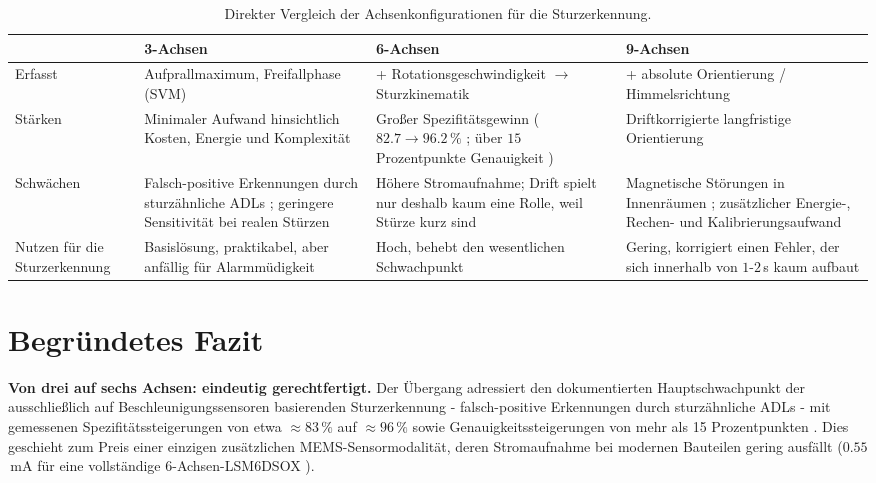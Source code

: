 \documentclass[11pt,a4paper,oneside]{report}
\begin{document}
\begin{table}[H]
\centering
\caption{Direkter Vergleich der Achsenkonfigurationen für die Sturzerkennung.}
\label{tab:glance}
\small
\begin{tabularx}{\textwidth}{l X X X}
\toprule
 & \textbf{3-Achsen} & \textbf{6-Achsen} & \textbf{9-Achsen} \\
\midrule
Erfasst
& Aufprallmaximum, Freifallphase (\ac{SVM})
& + Rotationsgeschwindigkeit $\rightarrow$ Sturzkinematik
& + absolute Orientierung / Himmelsrichtung \\
Stärken
& Minimaler Aufwand hinsichtlich Kosten, Energie und Komplexität
& Großer Spezifitätsgewinn ($82.7\rightarrow96.2\,\%$ \cite{huynh2015}; über $15$ Prozentpunkte Genauigkeit \cite{hakim2019})
& Driftkorrigierte langfristige Orientierung \cite{roetenberg2005} \\
Schwächen
& Falsch-positive Erkennungen durch sturzähnliche \acp{ADL}
\cite{dinh2021,huynh2015}; geringere Sensitivität bei realen Stürzen
\cite{bagala2012}
& Höhere Stromaufnahme; Drift spielt nur deshalb kaum eine Rolle, weil Stürze kurz sind
& Magnetische Störungen in Innenräumen
\cite{pmc11991382,yang2024neurit,pubmed25347584}; zusätzlicher Energie-, Rechen- und Kalibrierungsaufwand \\
Nutzen für die Sturzerkennung
& Basislösung, praktikabel, aber anfällig für Alarmmüdigkeit
& Hoch, behebt den wesentlichen Schwachpunkt
& Gering, korrigiert einen Fehler, der sich innerhalb von $1$-$2$\,s kaum aufbaut \\
\bottomrule
\end{tabularx}
\end{table}

\section{Begründetes Fazit}
\label{sec:conclusion}

\textbf{Von drei auf sechs Achsen: eindeutig gerechtfertigt.} Der Übergang
adressiert den dokumentierten Hauptschwachpunkt der ausschließlich auf
Beschleunigungssensoren basierenden Sturzerkennung - falsch-positive
Erkennungen durch sturzähnliche \acp{ADL} - mit gemessenen
Spezifitätssteigerungen von etwa $\approx83\,\%$ auf
$\approx96\,\%$ \cite{huynh2015} sowie Genauigkeitssteigerungen von mehr als
15 Prozentpunkten \cite{hakim2019}. Dies geschieht zum Preis einer einzigen
zusätzlichen \ac{MEMS}-Sensormodalität, deren Stromaufnahme bei modernen
Bauteilen gering ausfällt ($0.55$\,mA für eine vollständige
6-Achsen-LSM6DSOX \cite{st_lsm6dsox}).
\end{document}
